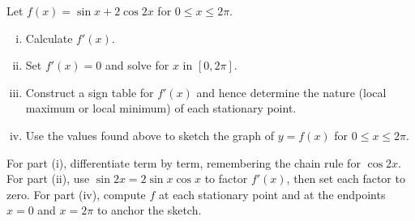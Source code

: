 \begin{problem}
Let $f(x) = \sin x + 2\cos 2x$ for $0 \le x \le 2\pi$.
\begin{enumerate}[(i)]
  \item Calculate $f'(x)$.
  \item Set $f'(x) = 0$ and solve for $x$ in $[0, 2\pi]$.
  \item Construct a sign table for $f'(x)$ and hence determine the nature (local maximum or
        local minimum) of each stationary point.
  \item Use the values found above to sketch the graph of $y = f(x)$ for $0 \le x \le 2\pi$.
\end{enumerate}
\end{problem}

\begin{hintbox}
For part (i), differentiate term by term, remembering the chain rule for $\cos 2x$.
For part (ii), use $\sin 2x = 2\sin x\cos x$ to factor $f'(x)$, then set each factor to zero.
For part (iv), compute $f$ at each stationary point and at the endpoints $x = 0$ and $x = 2\pi$
to anchor the sketch.
\end{hintbox}

